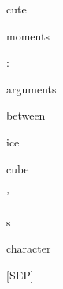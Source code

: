 \documentclass[varwidth=150mm]{standalone}
\begin{document}
\begin{CJK*}{UTF8}{gbsn}
{{{\colorbox{red!8.968523979187012}{\strut cute} \colorbox{red!11.014426231384277}{\strut moments} \colorbox{red!22.0574951171875}{\strut :} \colorbox{red!3.720573663711548}{\strut arguments} \colorbox{red!0.0}{\strut between} \colorbox{red!5.271068096160889}{\strut ice} \colorbox{red!15.595405578613281}{\strut cube} \colorbox{red!4.6316609382629395}{\strut '} \colorbox{red!2.7139205932617188}{\strut s} \colorbox{red!5.493113994598389}{\strut character} \colorbox{red!1.7932007312774658}{\strut [SEP]}
}}}
\end{CJK*}
\end{document}
